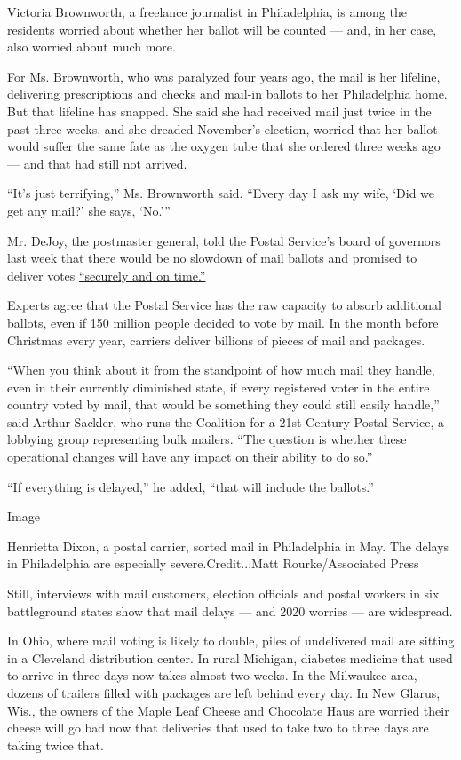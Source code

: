 Victoria Brownworth, a freelance journalist in Philadelphia, is among
the residents worried about whether her ballot will be counted --- and,
in her case, also worried about much more.

For Ms. Brownworth, who was paralyzed four years ago, the mail is her
lifeline, delivering prescriptions and checks and mail-in ballots to her
Philadelphia home. But that lifeline has snapped. She said she had
received mail just twice in the past three weeks, and she dreaded
November's election, worried that her ballot would suffer the same fate
as the oxygen tube that she ordered three weeks ago --- and that had
still not arrived.

``It's just terrifying,'' Ms. Brownworth said. ``Every day I ask my
wife, `Did we get any mail?' she says, `No.'''

Mr. DeJoy, the postmaster general, told the Postal Service's board of
governors last week that there would be no slowdown of mail ballots and
promised to deliver votes
\href{https://www.nytimes3xbfgragh.onion/aponline/2020/08/07/us/politics/bc-us-virus-outbreak-postal-service.html}{``securely
and on time.''}

Experts agree that the Postal Service has the raw capacity to absorb
additional ballots, even if 150 million people decided to vote by mail.
In the month before Christmas every year, carriers deliver billions of
pieces of mail and packages.

``When you think about it from the standpoint of how much mail they
handle, even in their currently diminished state, if every registered
voter in the entire country voted by mail, that would be something they
could still easily handle,'' said Arthur Sackler, who runs the Coalition
for a 21st Century Postal Service, a lobbying group representing bulk
mailers. ``The question is whether these operational changes will have
any impact on their ability to do so.''

``If everything is delayed,'' he added, ``that will include the
ballots.''

Image

Henrietta Dixon, a postal carrier, sorted mail in Philadelphia in May.
The delays in Philadelphia are especially severe.Credit...Matt
Rourke/Associated Press

Still, interviews with mail customers, election officials and postal
workers in six battleground states show that mail delays --- and 2020
worries --- are widespread.

In Ohio, where mail voting is likely to double, piles of undelivered
mail are sitting in a Cleveland distribution center. In rural Michigan,
diabetes medicine that used to arrive in three days now takes almost two
weeks. In the Milwaukee area, dozens of trailers filled with packages
are left behind every day. In New Glarus, Wis., the owners of the Maple
Leaf Cheese and Chocolate Haus are worried their cheese will go bad now
that deliveries that used to take two to three days are taking twice
that.

